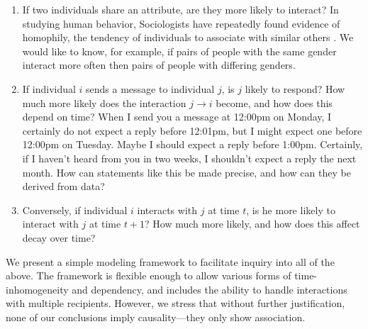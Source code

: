 \documentclass[aoas,preprint]{imsart}
\begin{document}
\begin{enumerate}
	\item If two individuals share an attribute, are they more likely to interact?  In studying human behavior, Sociologists have repeatedly found evidence of homophily, the tendency of individuals to associate with similar others \cite{mcpherson2001birds}.  We would like to know, for example, if pairs of people with the same gender interact more often then pairs of people with differing genders.
	
	\item If individual $i$ sends a message to individual $j$, is $j$ likely to respond?  How much more likely does the interaction $j \to i$ become, and how does this depend on time?  When I send you a message at 12:00pm on Monday, I certainly do not expect a reply before 12:01pm, but I might expect one before 12:00pm on Tuesday.  Maybe I should expect a reply before 1:00pm.  Certainly, if I haven't heard from you in two weeks, I shouldn't expect a reply the next month.  How can statements like this be made precise, and how can they be derived from data?
	
	\item Conversely, if individual $i$ interacts with $j$ at time $t$, is he more likely to interact with $j$ at time $t+1$?  How much more likely, and how does this affect decay over time?
\end{enumerate}

We present a simple modeling framework to facilitate inquiry into all of the above.  The framework is flexible enough to allow various forms of time-inhomogeneity and dependency, and includes the ability to handle interactions with multiple recipients.  However, we stress that without further justification, none of our conclusions imply causality---they only show association.



\end{document}
